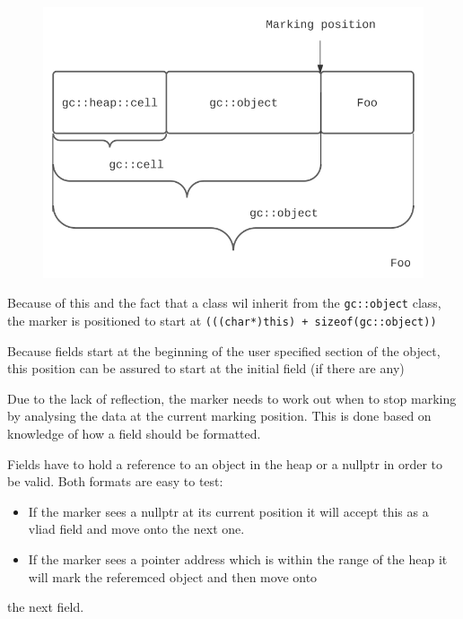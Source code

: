 \documentclass[11pt]{article}
\begin{document}
\begin{figure}[H]
%
    \begin{center}
    \includegraphics[scale=0.5]{./report_srcs/c_plus_plus_casting.png}
    \end{center}
\end{figure}

Because of this and the fact that a class wil inherit from the \texttt{gc::object} class, the marker is positioned to start
at \texttt{(((char*)this) + sizeof(gc::object))}

Because fields start at the beginning of the user specified section of the object, this position can be assured to start
at the initial field (if there are any)

Due to the lack of reflection, the marker needs to work out when to stop marking by analysing the data at the current marking position.
This is done based on knowledge of how a field should be formatted.

Fields have to hold a reference to an object in the heap or a nullptr in order to be valid. Both formats are easy to test:
\begin{itemize}
\item If the marker sees a nullptr at its current position it will accept this as a vliad field and move onto the next one.
\item If the marker sees a pointer address which is within the range of the heap it will mark the referemced object and then move onto
\end{itemize}
the next field.
\end{document}
